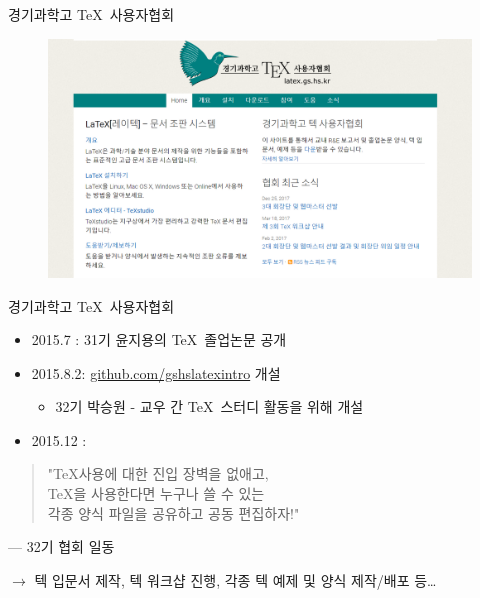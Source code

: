 \documentclass[12pt]{gshs_lecture}
\begin{document}
\begin{frame}[t]{경기과학고 \TeX\ 사용자협회}
	\begin{figure}[h]
		\centering
		\includegraphics[width=\textwidth]{./pictures/homepage.png}
	\end{figure}
\end{frame}

\begin{frame}[t]{경기과학고 \TeX\ 사용자협회}
	\begin{itemize}
		\item 2015.7 : 31기 윤지용의 \TeX\ 졸업논문 공개
		\item 2015.8.2: \url{github.com/gshslatexintro} 개설
		\begin{itemize}
			\item 32기 박승원 - 교우 간 \TeX\ 스터디 활동을 위해 개설
		\end{itemize}
		\item 2015.12 :
	\end{itemize}
	\begin{quote}
		"\TeX 사용에 대한 진입 장벽을 없애고, \\
		\TeX 을 사용한다면 누구나 쓸 수 있는 \\
		각종 양식 파일을 공유하고 공동 편집하자!"
	\end{quote}
	\vspace{-.5cm}
	\begin{flushright}
		--- 32기 협회 일동
	\end{flushright}
	$ \rightarrow $ 텍 입문서 제작, 텍 워크샵 진행, 각종 텍 예제 및 양식 제작/배포 등\ldots
\end{frame}
\end{document}
